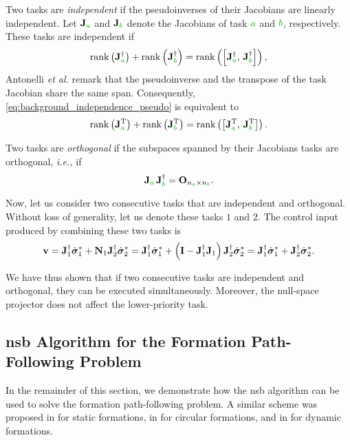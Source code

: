 Two tasks are \emph{independent} if the pseudoinverses of their Jacobians are linearly independent.
Let $\mat{J}_{\dm{a}}$ and $\mat{J}_{\dm{b}}$ denote the Jacobians of task $\dm{a}$ and $\dm{b}$, respectively.
These tasks are independent if
\begin{equation}
    {\rank} \left(\mat{J}_{\dm{a}}^{\dagger}\right) + {\rank} \left(\mat{J}_{\dm{b}}^{\dagger}\right) = {\rm rank} \left(\left[ \mat{J}_{\dm{a}}^{\dagger},\, \mat{J}_{\dm{b}}^{\dagger} \right]\right),
    \label{eq:background_independence_pseudo}
\end{equation}
Antonelli \emph{et al.} \cite{antonelli_stability_2008} remark that the pseudoinverse and the transpose of the task Jacobian share the same span.
Consequently, \eqref{eq:background_independence_pseudo} is equivalent to
\begin{equation}
    {\rank} \left(\mat{J}_{\dm{a}}\T\right) + {\rank} \left(\mat{J}_{\dm{b}}\T\right) = {\rm rank} \left(\left[ \mat{J}_{\dm{a}}\T,\, \mat{J}_{\dm{b}}\T \right]\right).
    \label{eq:background_independence}
\end{equation}

Two tasks are \emph{orthogonal} if the subspaces spanned by their Jacobians tasks are orthogonal, \emph{i.e.,} if
\begin{equation}
    \mat{J}_{\dm{a}} \, \mat{J}_{\dm{b}}^{\dagger} = \mat{O}_{n_{\dm{a}} \times n_{\dm{b}}}.
\end{equation}

Now, let us consider two consecutive tasks that are independent and orthogonal. 
Without loss of generality, let us denote these tasks $1$ and $2$.
The control input produced by combining these two tasks is
\begin{equation}
    \mathbf{v} = \mathbf{J}_1^{\dagger} \dot{\bm{\sigma}}_1^{*} + \mathbf{N}_1 \mathbf{J}_2^{\dagger} \dot{\bm{\sigma}}_2^{*}
    = \mathbf{J}_1^{\dagger} \dot{\bm{\sigma}}_1^{*} + \left(\mathbf{I} - \mathbf{J}_1^{\dagger}\mathbf{J}_1\right) \mathbf{J}_2^{\dagger} \dot{\bm{\sigma}}_2^{*}
    = \mathbf{J}_1^{\dagger} \dot{\bm{\sigma}}_1^{*} + \mathbf{J}_2^{\dagger} \dot{\bm{\sigma}}_2^{*}.
\end{equation}

We have thus shown that if two consecutive tasks are independent and orthogonal, they can be executed simultaneously.
Moreover, the null-space projector does not affect the lower-priority task.

\subsection{\gls{nsb} Algorithm for the Formation Path-Following Problem}
\label{sec:background_nsb_formation_path_following}
In the remainder of this section, we demonstrate how the \gls{nsb} algorithm can be used to solve the formation path-following problem.
A similar scheme was proposed in \cite{arrichiello_formation_2006} for static formations, in \cite{antonelli_2006_kinematic,antonelli_stability_2008} for circular formations, and in \cite{eek_formation_2021} for dynamic formations.

